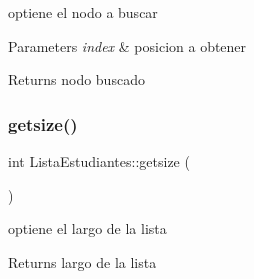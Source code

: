 optiene el nodo a buscar 


\begin{DoxyParams}{Parameters}
{\em index} & posicion a obtener \\
\hline
\end{DoxyParams}
\begin{DoxyReturn}{Returns}
nodo buscado 
\end{DoxyReturn}
\mbox{\label{classListaEstudiantes_a8db0ded4430c0f3457feaa24df975dfc}} 
\subsubsection{\texorpdfstring{getsize()}{getsize()}}
{\footnotesize\ttfamily int Lista\+Estudiantes\+::getsize (\begin{DoxyParamCaption}{ }\end{DoxyParamCaption})\hspace{0.3cm}{\ttfamily [inline]}}



optiene el largo de la lista 

\begin{DoxyReturn}{Returns}
largo de la lista 
\end{DoxyReturn}
\mbox{\label{classListaEstudiantes_a1c325ec864441b71d44a990f1d887726}} 
